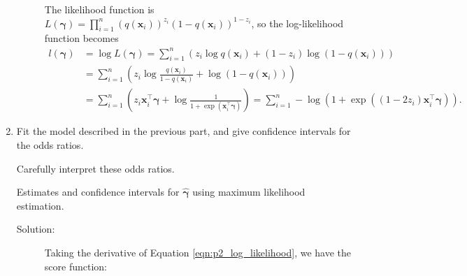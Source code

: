 \documentclass[letterpaper,11pt]{article}
\begin{document}
\begin{enumerate}
\begin{description}
    The likelihood function is
    $L\left( \bm{\gamma} \right) = \prod_{i=1}^n
    \left(q\left(\mathbf{x}_i\right)\right)^{z_i} \left(1 -
      q\left(\mathbf{x}_i\right)\right)^{1 - z_i}$, so the log-likelihood
    function becomes
    \begin{align}
      l\left(\bm{\gamma}\right)
      &= \log L\left( \bm{\gamma} \right)
        = \sum_{i=1}^n \left(
        z_i \log q\left(\mathbf{x}_i\right)
        +
        \left(1 - z_i \right) \log\left(1 - q\left(\mathbf{x}_i\right)\right)
        \right)
        \label{eqn:p2_log_likelihood}\\
      &= \sum_{i=1}^n\left(
        z_i\log\frac{q\left(\mathbf{x}_i\right)}{1 -q\left(\mathbf{x}_i\right)}
        + \log\left(1 -q\left(\mathbf{x}_i\right)\right)
        \right) \nonumber\\
      &= \sum_{i=1}^n
        \left(
        z_i\mathbf{x}_i^\intercal\bm{\gamma} +
        \log\frac{1}{1 + \exp\left(\mathbf{x}_i^\intercal\bm{\gamma}\right)}
        \right)
        = \sum_{i=1}^n
        -\log\left(
        1 + \exp\left(\left(1 - 2z_i\right)\mathbf{x}_i^\intercal\bm{\gamma}\right)
        \right). \nonumber
    \end{align}
  \end{description}
\item Fit the model described in the previous part, and give confidence
  intervals for the odds ratios.

  Carefully interpret these odds ratios.

  \begin{table}[!h]
    \centering
    
    \caption{Estimates and confidence intervals for $\hat{\bm\gamma}$ using
      maximum likelihood estimation.}
    \label{tab:p3_gamma_hat}
  \end{table}
  
  \begin{description}
  \item[Solution:] Taking the derivative of Equation
    \ref{eqn:p2_log_likelihood}, we have the score function:


\end{description}
\end{enumerate}
\end{document}
